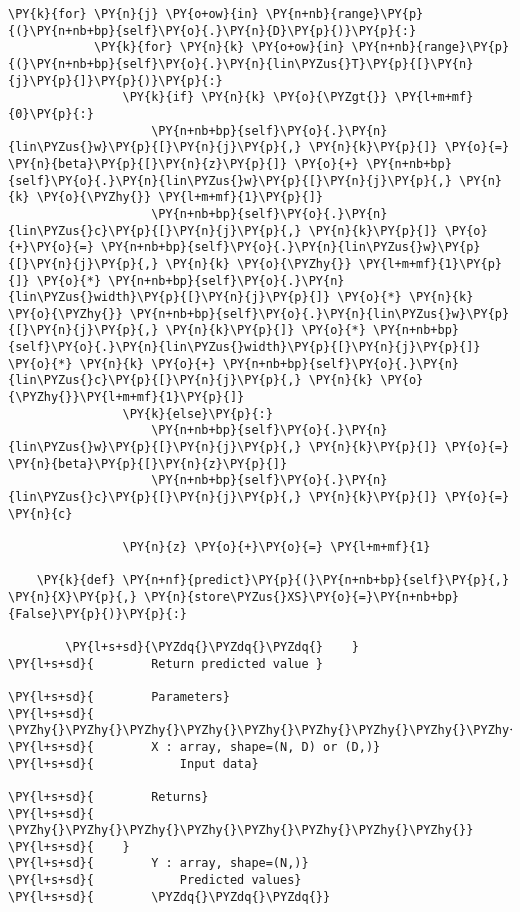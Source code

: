\begin{Verbatim}[commandchars=\\\{\}]
        \PY{k}{for} \PY{n}{j} \PY{o+ow}{in} \PY{n+nb}{range}\PY{p}{(}\PY{n+nb+bp}{self}\PY{o}{.}\PY{n}{D}\PY{p}{)}\PY{p}{:}
            \PY{k}{for} \PY{n}{k} \PY{o+ow}{in} \PY{n+nb}{range}\PY{p}{(}\PY{n+nb+bp}{self}\PY{o}{.}\PY{n}{lin\PYZus{}T}\PY{p}{[}\PY{n}{j}\PY{p}{]}\PY{p}{)}\PY{p}{:}
                \PY{k}{if} \PY{n}{k} \PY{o}{\PYZgt{}} \PY{l+m+mf}{0}\PY{p}{:}
                    \PY{n+nb+bp}{self}\PY{o}{.}\PY{n}{lin\PYZus{}w}\PY{p}{[}\PY{n}{j}\PY{p}{,} \PY{n}{k}\PY{p}{]} \PY{o}{=} \PY{n}{beta}\PY{p}{[}\PY{n}{z}\PY{p}{]} \PY{o}{+} \PY{n+nb+bp}{self}\PY{o}{.}\PY{n}{lin\PYZus{}w}\PY{p}{[}\PY{n}{j}\PY{p}{,} \PY{n}{k} \PY{o}{\PYZhy{}} \PY{l+m+mf}{1}\PY{p}{]}
                    \PY{n+nb+bp}{self}\PY{o}{.}\PY{n}{lin\PYZus{}c}\PY{p}{[}\PY{n}{j}\PY{p}{,} \PY{n}{k}\PY{p}{]} \PY{o}{+}\PY{o}{=} \PY{n+nb+bp}{self}\PY{o}{.}\PY{n}{lin\PYZus{}w}\PY{p}{[}\PY{n}{j}\PY{p}{,} \PY{n}{k} \PY{o}{\PYZhy{}} \PY{l+m+mf}{1}\PY{p}{]} \PY{o}{*} \PY{n+nb+bp}{self}\PY{o}{.}\PY{n}{lin\PYZus{}width}\PY{p}{[}\PY{n}{j}\PY{p}{]} \PY{o}{*} \PY{n}{k} \PY{o}{\PYZhy{}} \PY{n+nb+bp}{self}\PY{o}{.}\PY{n}{lin\PYZus{}w}\PY{p}{[}\PY{n}{j}\PY{p}{,} \PY{n}{k}\PY{p}{]} \PY{o}{*} \PY{n+nb+bp}{self}\PY{o}{.}\PY{n}{lin\PYZus{}width}\PY{p}{[}\PY{n}{j}\PY{p}{]} \PY{o}{*} \PY{n}{k} \PY{o}{+} \PY{n+nb+bp}{self}\PY{o}{.}\PY{n}{lin\PYZus{}c}\PY{p}{[}\PY{n}{j}\PY{p}{,} \PY{n}{k} \PY{o}{\PYZhy{}}\PY{l+m+mf}{1}\PY{p}{]}
                \PY{k}{else}\PY{p}{:}
                    \PY{n+nb+bp}{self}\PY{o}{.}\PY{n}{lin\PYZus{}w}\PY{p}{[}\PY{n}{j}\PY{p}{,} \PY{n}{k}\PY{p}{]} \PY{o}{=} \PY{n}{beta}\PY{p}{[}\PY{n}{z}\PY{p}{]}
                    \PY{n+nb+bp}{self}\PY{o}{.}\PY{n}{lin\PYZus{}c}\PY{p}{[}\PY{n}{j}\PY{p}{,} \PY{n}{k}\PY{p}{]} \PY{o}{=} \PY{n}{c}

                \PY{n}{z} \PY{o}{+}\PY{o}{=} \PY{l+m+mf}{1}

    \PY{k}{def} \PY{n+nf}{predict}\PY{p}{(}\PY{n+nb+bp}{self}\PY{p}{,} \PY{n}{X}\PY{p}{,} \PY{n}{store\PYZus{}XS}\PY{o}{=}\PY{n+nb+bp}{False}\PY{p}{)}\PY{p}{:}
        
        \PY{l+s+sd}{\PYZdq{}\PYZdq{}\PYZdq{}    }
\PY{l+s+sd}{        Return predicted value }

\PY{l+s+sd}{        Parameters}
\PY{l+s+sd}{        \PYZhy{}\PYZhy{}\PYZhy{}\PYZhy{}\PYZhy{}\PYZhy{}\PYZhy{}\PYZhy{}\PYZhy{}\PYZhy{}\PYZhy{}}
\PY{l+s+sd}{        X : array, shape=(N, D) or (D,)}
\PY{l+s+sd}{            Input data}

\PY{l+s+sd}{        Returns}
\PY{l+s+sd}{        \PYZhy{}\PYZhy{}\PYZhy{}\PYZhy{}\PYZhy{}\PYZhy{}\PYZhy{}\PYZhy{}}
\PY{l+s+sd}{    }
\PY{l+s+sd}{        Y : array, shape=(N,)}
\PY{l+s+sd}{            Predicted values}
\PY{l+s+sd}{        \PYZdq{}\PYZdq{}\PYZdq{}}
        

\end{Verbatim}
